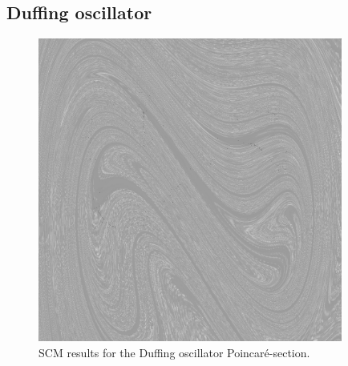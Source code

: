 \documentclass[11pt]{article}
\begin{document}
\subsection{Duffing oscillator}

\begin{figure}[h]
	\centering
	\includegraphics[width=10cm]{fig/duffing.jpg}
	\caption{SCM results for the Duffing oscillator Poincaré-section.}
\end{figure}
\end{document}
